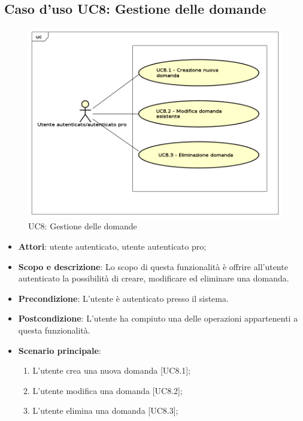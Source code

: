 \subsection{Caso d'uso UC8: Gestione delle domande}
	\label{UC8}
	\begin{figure}[h]
		\centering
			\includegraphics[scale=0.45,keepaspectratio]{UML/UC8.png}
		\caption{UC8: Gestione delle domande}
	\end{figure}
	\FloatBarrier
	\begin{itemize}
		\item
			\textbf{Attori}: utente autenticato, utente autenticato pro;
		\item		
			\textbf{Scopo e descrizione}: Lo scopo di questa funzionalità è offrire all'utente autenticato la possibilità di creare, modificare ed eliminare una domanda.
		\item
			\textbf{Precondizione}: L'utente è autenticato presso il sistema. 
		\item
			\textbf{Postcondizione}: L'utente ha compiuto una delle operazioni appartenenti a questa funzionalità.		
		\item
			\textbf{Scenario principale}:
	       		\begin{enumerate}
					\item
					L'utente crea una nuova domanda [UC8.1];
					\item
					L'utente modifica una domanda [UC8.2];
					\item
					L'utente elimina una domanda [UC8.3];
	 			\end{enumerate}
	\end{itemize}
